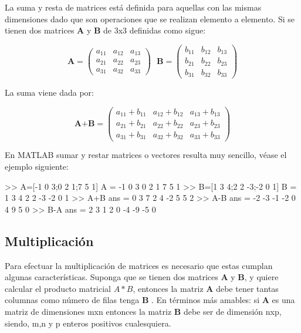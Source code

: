 La suma y resta de matrices está definida para aquellas con las mismas
dimensiones dado que son operaciones que se realizan elemento a
elemento. Si se tienen dos matrices \textbf{A} y \textbf{B} de 3x3
definidas como sigue:

$$
\textbf{A}=
\begin{pmatrix}
    a_{11} & a_{12} & a_{13} \\
    a_{21} & a_{22} & a_{23} \\
    a_{31} & a_{32} & a_{33}
\end{pmatrix}
\,\,\,\,
\textbf{B}=
\begin{pmatrix}
    b_{11} & b_{12} & b_{13} \\
    b_{21} & b_{22} & b_{23} \\
    b_{31} & b_{32} & b_{33}
\end{pmatrix}
$$

La suma viene dada por:

$$
\textbf{A+B} = \begin{pmatrix}
    a_{11}+b_{11} & a_{12}+b_{12} & a_{13}+b_{13} \\
    a_{21}+b_{21} & a_{22}+b_{22} & a_{23}+b_{23} \\
    a_{31}+b_{31} & a_{32}+b_{32} & a_{33}+b_{33}
\end{pmatrix}
$$

En MATLAB sumar y restar matrices o vectores resulta muy sencillo, véase
el ejemplo siguiente:

\begin{matlab}
>> A=[-1 0 3;0 2 1;7 5 1]
A =
    -1     0     3
     0     2     1
     7     5     1
>> B=[1 3 4;2 2 -3;-2 0 1]
B =
     1     3     4
     2     2    -3
    -2     0     1
>> A+B
ans =
     0     3     7
     2     4    -2
     5     5     2
>> A-B
ans =
    -2    -3    -1
    -2     0     4
     9     5     0
>> B-A
ans =
     2     3     1
     2     0    -4
    -9    -5     0
\end{matlab}

\subsection{Multiplicación}\label{multiplicacion}

Para efectuar la multiplicación de matrices es necesario que estas
cumplan algunas características. Suponga que se tienen dos matrices
\textbf{A} y \textbf{B}, y quiere calcular el producto matricial
$A \ast B$, entonces la matriz \textbf{A} debe tener tantas columnas
como número de filas tenga \textbf{B} . En términos más amables: si
\textbf{A} es una matriz de dimensiones mxn entonces la matriz \textbf{B} debe
ser de dimensión nxp, siendo, m,n y p enteros positivos cualesquiera.\\


